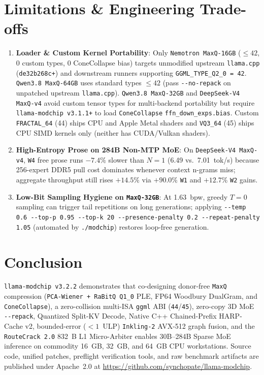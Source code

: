 \documentclass[10pt,twocolumn]{article}
\begin{document}
\section{Limitations \& Engineering Trade-offs}
\begin{enumerate}
    \item \textbf{Loader \& Custom Kernel Portability}: Only \texttt{Nemotron MaxQ-16GB} ($\le 42$, 0 custom types, 0 ConeCollapse bias) targets unmodified upstream \texttt{llama.cpp} (\texttt{de32b268c+}) and downstream runners supporting \texttt{GGML\_TYPE\_Q2\_0 = 42}. \texttt{Qwen3.8 MaxQ-64GB} uses standard types $\le 42$ (pass \texttt{{-}{-}no-repack} on unpatched upstream \texttt{llama.cpp}). \texttt{Qwen3.8 MaxQ-32GB} and \texttt{DeepSeek-V4 MaxQ-v4} avoid custom tensor types for multi-backend portability but require \texttt{llama-modchip v3.1.1+} to load \texttt{ConeCollapse} \texttt{ffn\_down\_exps.bias}. Custom \texttt{FRACTAL\_64} (44) ships CPU and Apple Metal shaders and \texttt{VQ3\_64} (45) ships CPU SIMD kernels only (neither has CUDA/Vulkan shaders).
    \item \textbf{High-Entropy Prose on 284B Non-MTP MoE}: On \texttt{DeepSeek-V4 MaxQ-v4}, \texttt{W4} free prose runs $-7.4\%$ slower than $N=1$ (6.49 vs.\ 7.01~tok/s) because 256-expert DDR5 pull cost dominates whenever context n-grams miss; aggregate throughput still rises $+14.5\%$ via $+90.0\%$ \texttt{W1} and $+12.7\%$ \texttt{W2} gains.
    \item \textbf{Low-Bit Sampling Hygiene on \texttt{MaxQ-32GB}}: At 1.63~bpw, greedy $T=0$ sampling can trigger tail repetitions on long generations; applying \texttt{{-}{-}temp 0.6 {-}{-}top-p 0.95 {-}{-}top-k 20 {-}{-}presence-penalty 0.2 {-}{-}repeat-penalty 1.05} (automated by \texttt{./modchip}) restores loop-free generation.
\end{enumerate}

\section{Conclusion}
\texttt{llama-modchip v3.2.2} demonstrates that co-designing donor-free \texttt{MaxQ} compression (\texttt{PCA-Wiener + RaBitQ Q1\_0} PLE, FP64 Woodbury DualGram, and \texttt{ConeCollapse}), a zero-collision multi-ISA \texttt{ggml} ABI (\texttt{44}/\texttt{45}), zero-copy 3D MoE \texttt{{-}{-}repack}, Quantized Split-KV Decode, Native C++ Chained-Prefix HARP-Cache v2, bounded-error ($<1$~ULP) \texttt{Inkling-2} AVX-512 graph fusion, and the \texttt{RouteCrack 2.0} 832~B L1 Micro-Arbiter enables 30B--284B Sparse MoE inference on commodity 16~GB, 32~GB, and 64~GB CPU workstations. Source code, unified patches, preflight verification tools, and raw benchmark artifacts are published under Apache~2.0 at \url{https://github.com/synchopate/llama-modchip}.
\end{document}

